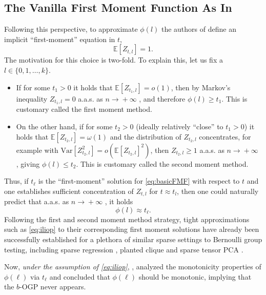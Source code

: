 \documentclass[12pt,reqno]{amsart}
\numberwithin{equation}{section}
\theoremstyle{definition}
\newcommand{\E}{\mathbb{E}}
\newcommand{\conv}[1]{\overset{#1}{\rightarrow}}
\renewcommand{\[}{\begin{equation}}
\renewcommand{\]}{\end{equation}}
\renewcommand{\|}{\bigg{|}}
\newcommand{\ngrow}{\ensuremath{n \conv{} +\infty} }
\newcommand{\range}[1]{\ensuremath{\{0,1,\dots, #1\}}}
\newcommand{\bogp}{$b$-OGP }
\begin{document}
\subsection{The Vanilla First Moment Function As In \cite{iliopoulos2021group}}\label{subsec:VFMF}
Following this perspective, to approximate $\phi(l)$ the authors of \cite{iliopoulos2021group} define an implicit ``first-moment'' equation in $t$,
\[\E[Z_{t,l}] = 1\label{eq:basicFMF}.\]
The motivation for this choice is two-fold. To explain this, let us fix a $l \in \range{k}$.
\begin{itemize}
    \item[(a)] If for some $t_1>0$ it holds that $\E[Z_{t_1,l}] =o(1)$, then by Markov's inequality $Z_{t_1,l}=0$ a.a.s. as \ngrow\!, and therefore $\phi(l) \geq t_1.$ This is customary called the first moment method.

    \item[(b)] On the other hand, if for some $t_2>0$ (ideally relatively ``close'' to $t_1>0$) it holds that $\E[Z_{t_2,l}] =\omega(1)$ and the distribution of $Z_{t_2,l}$ concentrates, for example with $\mathrm{Var}[Z^2_{t_2,l}]=o(\E[Z_{t_2,l}]^2)$, then $Z_{t_2,l} \geq 1$ a.a.s. as \ngrow\!, giving $\phi(l) \leq t_2.$ This is customary called the second moment method.
\end{itemize}Thus, if $t_{\ell}$ is the ``first-moment'' solution for \eqref{eq:basicFMF} with respect to $t$ and one establishes sufficient concentration of $Z_{t,l}$ for $t \approx t_l$, then one could naturally predict that a.a.s. as \ngrow\!, it holds
\[\label{eq:iliop}
    \phi(l) \approx t_{\ell}.
\] Following the first and second moment method strategy, tight approximations such as \eqref{eq:iliop} to their corresponding first moment solutions have already been successfully established for a plethora of similar sparse settings to Bernoulli group testing, including sparse regression \cite{gamarnik2022sparse, chen2024low}, planted clique \cite{gamarnik2024overlap} and sparse tensor PCA \cite{arous2023free, chen2024low}. 


Now, \emph{under the assumption of \eqref{eq:iliop}}, \cite{iliopoulos2021group}, analyzed the monotonicity properties of $\phi(\ell)$ via $t_{\ell}$ and concluded that $\phi(\ell)$ should be monotonic, implying that the \bogp never appears. 
\end{document}

